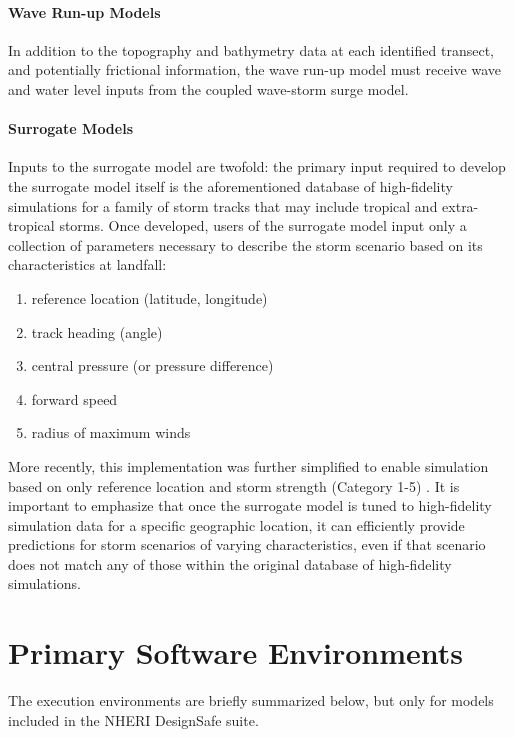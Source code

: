 \paragraph{Wave Run-up Models} In addition to the topography and bathymetry data at each identified transect, and potentially frictional information, the wave run-up model must receive wave and water level inputs from the coupled wave-storm surge model.


\paragraph{Surrogate Models} Inputs to the surrogate model are twofold: the primary input required to develop the surrogate model itself is the aforementioned database of high-fidelity simulations for a family of storm tracks that may include tropical and extra-tropical storms. Once developed, users of the surrogate model input only a collection of parameters necessary to describe the storm scenario based on its characteristics at landfall: 

\begin{enumerate}
    \item reference location (latitude, longitude)
    \item track heading (angle)
    \item central pressure (or pressure difference)
    \item forward speed
    \item radius of maximum winds
\end{enumerate}

More recently, this implementation was further simplified to enable simulation based on only reference location and storm strength (Category 1-5) \citep{njcoast2018implementation}. It is important to emphasize that once the surrogate model is tuned to high-fidelity simulation data for a specific geographic location, it can efficiently provide predictions for storm scenarios of varying characteristics, even if that scenario does not match any of those within the original database of high-fidelity simulations. 

\section{Primary Software Environments}
\label{sec:storm_surge_tools}

The execution environments are briefly summarized below, but only for models included in the NHERI DesignSafe suite. 

